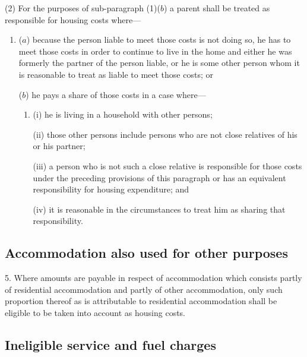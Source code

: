 \documentclass[a4paper]{article}
\begin{document}
(2) For the purposes of sub-paragraph (1)($b$) a parent shall be treated as responsible for housing costs where—
\begin{enumerate}\item[]
($a$) because the person liable to meet those costs is not doing so, he has to meet those costs in order to continue to live in the home and either he was formerly the partner of the person liable, or he is some other person whom it is reasonable to treat as liable to meet those costs; or

($b$) he pays a share of those costs in a case where—
\begin{enumerate}\item[]
(i) he is living in a household with other persons;

(ii) those other persons include persons who are not close relatives of his or his partner;

(iii) a person who is not such a close relative is responsible for those costs under the preceding provisions of this paragraph or has an equivalent responsibility for housing expenditure; and

(iv) it is reasonable in the circumstances to treat him as sharing that responsibility.
\end{enumerate}
\end{enumerate}

\subsection*{Accommodation also used for other purposes}

5.  Where amounts are payable in respect of accommodation which consists partly of residential accommodation and partly of other accommodation, only such proportion thereof as is attributable to residential accommodation shall be eligible to be taken into account as housing costs.

\subsection*{Ineligible service and fuel charges}
\end{document}
